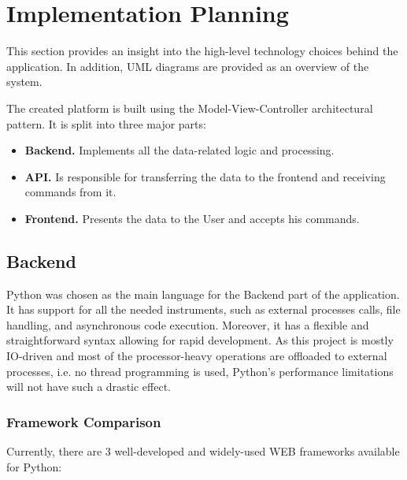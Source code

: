\chapter{Implementation Planning}
This section provides an insight into the high-level technology choices behind the application.
In addition, UML diagrams are provided as an overview of the system.

The created platform is built using the Model-View-Controller \cite{mvc} architectural pattern.
It is split into three major parts:
\begin{itemize}
    \item \textbf{Backend.} Implements all the data-related logic and processing.
    \item \textbf{API.} Is responsible for transferring the data to the frontend and receiving commands from it.
    \item \textbf{Frontend.} Presents the data to the User and accepts his commands.
\end{itemize}


\section{Backend}
Python was chosen as the main language for the Backend part of the application.
It has support for all the needed instruments, such as external processes calls,
file handling, and asynchronous code execution. Moreover, it has a flexible and straightforward
syntax allowing for rapid development.
As this project is mostly IO-driven and most of the processor-heavy operations are offloaded to external processes,
i.e. no thread programming is used, Python's performance limitations\cite{gil} will not have such a drastic effect.

\subsection{Framework Comparison}
Currently, there are 3 well-developed and widely-used WEB frameworks available for Python:

